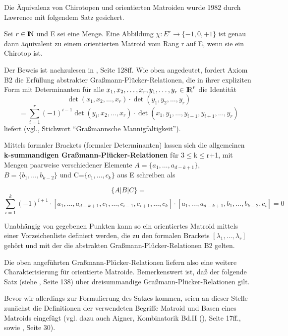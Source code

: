 Die Äquivalenz von Chirotopen und orientierten Matroiden wurde 1982 durch
Lawrence mit folgendem Satz gesichert.

\begin{satz}
Sei $r\in\mbox{$\rm I\!N$}$ und E sei eine Menge. Eine Abbildung
$\chi:E^r\to\{-1,0,+1\}$ ist genau dann äquivalent zu einem orientierten
Matroid vom Rang r auf E, wenn sie ein Chirotop ist.
\end{satz}

Der Beweis ist nachzulesen in \cite{Bj:93}, Seite 128ff. Wie oben angedeutet,
fordert Axiom B2 die Erfüllung abstrakter Graßmann-Plücker-Relationen,
 die in ihrer expliziten Form mit
Determinanten für alle $x_1,x_2,\ldots,x_r,y_1,\ldots,y_r \in \mbox{$\rm I\!R$}^r$ die
Identität
$$\det(x_1,x_2,\ldots,x_r) \cdot \det(y_1,y_2,\ldots,y_r)$$
$$= \sum\limits_{i=1}^r (-1)^{i-1} \det(y_i,x_2,\ldots,x_r) \cdot
    \det(x_1,y_1,\ldots,y_{i-1},y_{i+1},\ldots,y_r)$$
liefert (vgl.\cite{Na:72}, Stichwort "`Graßmannsche Mannigfaltigkeit"').

Mittels formaler Brackets (formaler Determinanten) lassen sich die allgemeinen
{\bf k-summandigen Graßmann-Plücker-Relationen} für 3$\leq$k$\leq$r+1, mit
Mengen paarweise verschiedener Elemente $A=\{a_1,\ldots,a_{d-k+1}\}$,
$B=\{b_1,\ldots,b_{k-2}\}$ und C=$\{c_1,\ldots,c_k\}$ aus E schreiben als

{\small
$$\{A|B|C\}=$$
$$\sum\limits_{i=1}^k(-1)^{i+1}\cdot
[a_1,\ldots,a_{d-k+1},c_1,\ldots,c_{i-1},c_{i+1},\ldots,c_k]\cdot
[a_1,\ldots,a_{d-k+1},b_1,\ldots,b_{k-2},c_i]=0$$}

Unabhängig von gegebenen Punkten kann so ein orientiertes Matroid mittels
einer Vorzeichenliste definiert werden, die zu den
formalen Brackets $[\lambda_1,\ldots,\lambda_r]$ gehört und mit der die
abstrakten Graß\-mann-Plücker-Relationen B2 gelten.

Die oben angeführten Graßmann-Plücker-Relationen liefern also eine weitere
Charakterisierung für orientierte Matroide. Bemerkenswert ist, daß der
folgende Satz (siehe \cite{Bj:93}, Seite 138) über dreisummandige
Graßmann-Plücker-Relationen
gilt.

Bevor wir allerdings zur Formulierung des Satzes kommen, seien an dieser Stelle
zunächst die Definitionen der verwendeten Begriffe Matroid und Basen eines
Matroids eingefügt (vgl. dazu auch Aigner, Kombinatorik Bd.II (\cite{Aig:76}),
Seite 17ff., sowie \cite{Schu:92}, Seite 30).\label{matroid}

